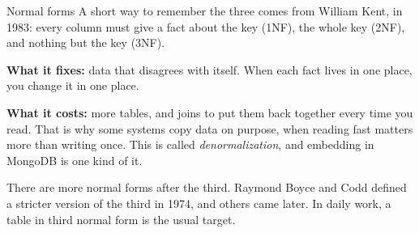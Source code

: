 \begin{center}
\end{center}

\begin{concept}{Normal forms}
A short way to remember the three comes from William Kent, in 1983: every
column must give a fact about the key (1NF), the whole key (2NF), and nothing
but the key (3NF).

\textbf{What it fixes:} data that disagrees with itself. When each fact lives
in one place, you change it in one place.

\textbf{What it costs:} more tables, and joins to put them back together
every time you read. That is why some systems copy data on purpose, when
reading fast matters more than writing once. This is called
\emph{denormalization}, and embedding in MongoDB is one kind of it.
\end{concept}

There are more normal forms after the third. Raymond Boyce and Codd defined a
stricter version of the third in 1974, and others came later. In daily work,
a table in third normal form is the usual target.

